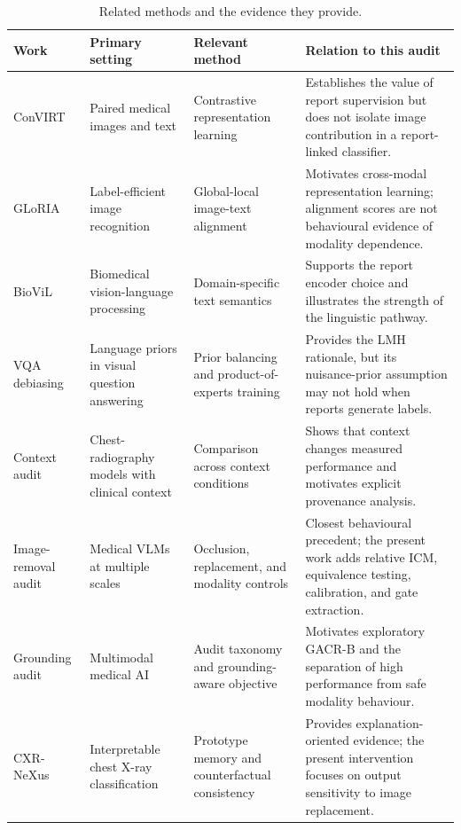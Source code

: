 \documentclass[10pt,a4paper,twocolumn]{article}
\begin{document}
\begin{table}[t]
\centering
\caption{Related methods and the evidence they provide.}
\label{tab:related-comparison}
\small
\setlength{\tabcolsep}{4pt}
\begin{tabular}{p{}p{}p{}p{}}
\toprule
Work & Primary setting & Relevant method & Relation to this audit \\
\midrule
ConVIRT \cite{zhang2022convirt} & Paired medical images and text & Contrastive representation learning & Establishes the value of report supervision but does not isolate image contribution in a report-linked classifier. \\
GLoRIA \cite{huang2021gloria} & Label-efficient image recognition & Global-local image-text alignment & Motivates cross-modal representation learning; alignment scores are not behavioural evidence of modality dependence. \\
BioViL \cite{boecking2022textsemantics} & Biomedical vision-language processing & Domain-specific text semantics & Supports the report encoder choice and illustrates the strength of the linguistic pathway. \\
VQA debiasing \cite{agrawal2018dontassume,clark2019easyway,cadene2019rubi} & Language priors in visual question answering & Prior balancing and product-of-experts training & Provides the LMH rationale, but its nuisance-prior assumption may not hold when reports generate labels. \\
Context audit \cite{wang2026clinicalcontext} & Chest-radiography models with clinical context & Comparison across context conditions & Shows that context changes measured performance and motivates explicit provenance analysis. \\
Image-removal audit \cite{lotfinia2026needimage} & Medical VLMs at multiple scales & Occlusion, replacement, and modality controls & Closest behavioural precedent; the present work adds relative ICM, equivalence testing, calibration, and gate extraction. \\
Grounding audit \cite{sadanandan2026consistentdangerous} & Multimodal medical AI & Audit taxonomy and grounding-aware objective & Motivates exploratory GACR-B and the separation of high performance from safe modality behaviour. \\
CXR-NeXus \cite{chiang2026cxrnexus} & Interpretable chest X-ray classification & Prototype memory and counterfactual consistency & Provides explanation-oriented evidence; the present intervention focuses on output sensitivity to image replacement. \\
\bottomrule
\end{tabular}
\end{table}
\end{document}
